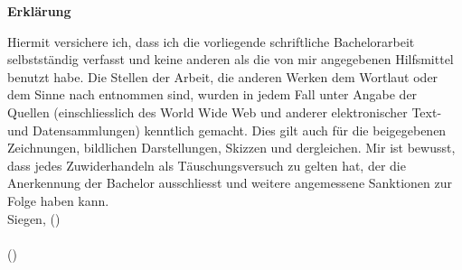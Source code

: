 \pagestyle{empty}
\makeatletter
\begin{center}
  \large\bfseries
  Erkl\"arung
\end{center}
\vspace{1cm}
\noindent
Hiermit versichere ich, dass ich die vorliegende schriftliche
Bachelor\-ar\-beit selbstst\"andig verfasst und keine anderen als die von mir
angegebenen Hilfsmittel benutzt habe. Die Stellen der Arbeit, die anderen Werken
dem Wortlaut oder dem Sinne nach entnommen sind, wurden in jedem Fall unter
Angabe der Quellen (einschliesslich des World Wide Web und anderer elektronischer
Text- und Datensammlungen) kenntlich gemacht. Dies gilt auch für die
beigegebenen Zeichnungen, bildlichen Darstellungen, Skizzen und dergleichen. Mir
ist bewusst, dass jedes Zuwiderhandeln als T\"auschungsversuch zu gelten hat, der
die Anerkennung der Bachelor ausschliesst und weitere angemessene
Sanktionen zur Folge haben kann.\\
\vspace{0.5cm}
Siegen, (\@date)\\
\vspace{0.5cm}
\underline{\hspace{8cm}}\\
(\@author)
\makeatother